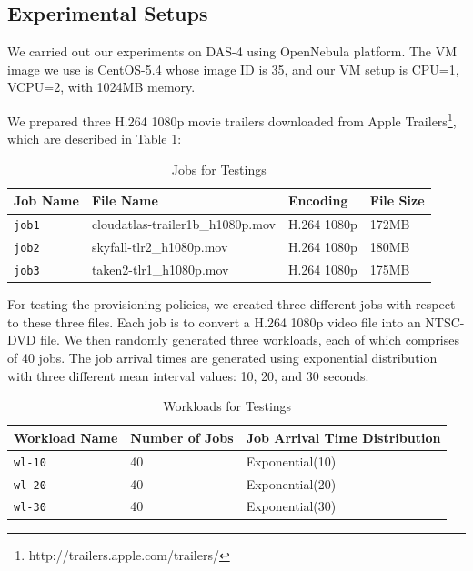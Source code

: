 \subsection{Experimental Setups}
We carried out our experiments on DAS-4 using OpenNebula platform. The
VM image we use is CentOS-5.4 whose image ID is 35, and our VM setup
is CPU=1, VCPU=2, with 1024MB memory.

We prepared three H.264 1080p movie trailers downloaded from Apple
Trailers\footnote{http://trailers.apple.com/trailers/}, which are
described in Table \ref{table_joblist}:

\begin{table}[!t]
  \caption{Jobs for Testings}
  \label{table_joblist}
  \centering
  \begin{tabular}{|l|l|l|l|}
    \hline
    Job Name & File Name & Encoding & File Size\\
    \hline
    \texttt{job1} & cloudatlas-trailer1b\_h1080p.mov & H.264 1080p & 172MB \\
    \hline
    \texttt{job2} & skyfall-tlr2\_h1080p.mov & H.264 1080p & 180MB \\
    \hline
    \texttt{job3} & taken2-tlr1\_h1080p.mov & H.264 1080p & 175MB \\
    \hline
  \end{tabular}
\end{table}

For testing the provisioning policies, we created three different jobs
with respect to these three files. Each job is to convert a H.264
1080p video file into an NTSC-DVD file. We then randomly generated
three workloads, each of which comprises of 40 jobs. The job arrival
times are generated using exponential distribution with three
different mean interval values: 10, 20, and 30 seconds.

\begin{table}[!t]
  \caption{Workloads for Testings}
  \label{table_workloadlist}
  \centering
  \begin{tabular}{|l|l|l|}
    \hline
    Workload Name & Number of Jobs & Job Arrival Time Distribution \\
    \hline
    \texttt{wl-10} & 40 & Exponential(10) \\
    \hline
    \texttt{wl-20} & 40 & Exponential(20) \\
    \hline
    \texttt{wl-30} & 40 & Exponential(30) \\
    \hline
  \end{tabular}
\end{table}


